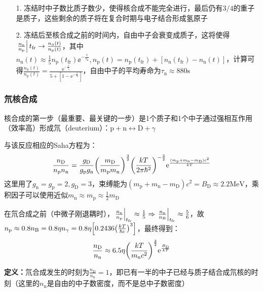 \begin{itemize}
	\item[1. ] 冻结时中子数比质子数少，使得核合成不能完全进行，最后仍有$3/4$的重子是质子，这些剩余的质子将在复合时期与电子结合形成氢原子
	
	\item[2. ] 冻结后至核合成之前的时间内，自由中子会衰变成质子，这将使得$\eval{\frac{n_{\text{n}}}{n_{\text{p}}}}{t_{\text{fr}}} \rightarrow \frac{n_{\text{n}}(t)}{n_{\text{p}}(t)}$，其中$n_{\text{n}}(t) \approx \frac{1}{5} n_{\text{p}}(t_{\text{fr}}) \ee^{-\frac{t}{\tau_{\text{n}}}}, n_{\text{p}}(t) = n_{\text{p}}(t_{\text{fr}}) + [n_{\text{n}}(t_{\text{fr}}) - n_{\text{n}}(t)]$，计算可得$\frac{n_{\text{n}}(t)}{n_{\text{p}}(t)} = \frac{\ee^{-\frac{t}{\tau_{\text{n}}}}}{5 + [1 - \ee^{-\frac{t}{\tau_{\text{n}}}}]}$，自由中子的平均寿命为$\tau_{\text{n}} \approx 880 \mathrm{s}$
\end{itemize}

\subsubsection{氘核合成}
\par 
核合成的第一步（最重要、最关键的一步）是1个质子和1个中子通过强相互作用（效率高）形成氘（deuterium）：$\text{p} + \text{n} \leftrightarrow \text{D} + \gamma$
\par 
与该反应相应的Saha方程为：
$$
\frac{n_{\text{D}}}{n_{\text{p}} n_{\text{n}}} = \frac{g_{\text{D}}}{g_{\text{p}} g_{\text{n}}} \qty(\frac{m_{\text{D}}}{m_{\text{p}} m_{\text{n}}})^{\frac{3}{2}} \qty(\frac{kT}{2 \pi \hbar^2})^{-\frac{3}{2}} \mathrm{e}^{\frac{(m_{\text{p}}+m_{\text{n}}-m_{\text{D}}) c^2}{k T}}
$$
这里用了$g_{\text{n}} = g_{\text{p}} = 2, g_{\text{D}} = 3$，束缚能为$(m_{\text{p}}+m_{\text{n}}-m_{\text{D}}) c^2 = B_{\text{D}} \approx 2.2 \mathrm{MeV}$，乘积因子可以使用近似$m_{\text{n}} \approx m_{\text{p}} \approx \frac{1}{2} m_{\text{D}}$
\par 
在氘合成之前（中微子刚退耦时），$\eval{\frac{n_{\text{n}}}{n_{\text{p}}}}_{t_{\text{fr}}} \approx \frac{1}{5} \Rightarrow \eval{\frac{n_{\text{n}}}{n_{\text{B}}}}_{t_{\text{fr}}} \approx \frac{5}{6}$，故$n_{\text{p}} \approx 0.8n_{\text{B}} = 0.8 \eta n_{\gamma} = 0.8 \eta \qty[0.2436 \qty(\frac{kT}{\hbar c})^3]$，最终得到：
$$
\frac{n_{\text{D}}}{n_{\text{n}}} \approx 6.5 \eta \qty(\frac{kT}{m_{\text{n}}c^2})^{\frac{3}{2}} \mathrm{e}^{\frac{B_{\text{D}}}{k T}}
$$
\par 
\textbf{定义：}氘合成发生的时刻为$\frac{n_{\text{D}}}{n_{\text{n}}} = 1$，即已有一半的中子已经与质子结合成氘核的时刻（这里的$n_{\text{n}}$是自由的中子数密度，而不是总中子数密度）

